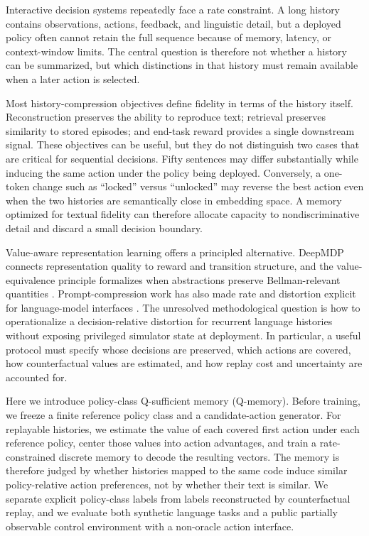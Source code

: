 \documentclass[11pt]{article}
\newcommand{\qmemory}{policy-class Q-sufficient memory (Q-memory)}
\begin{document}
Interactive decision systems repeatedly face a rate constraint. A long history contains observations, actions, feedback, and linguistic detail, but a deployed policy often cannot retain the full sequence because of memory, latency, or context-window limits. The central question is therefore not whether a history can be summarized, but which distinctions in that history must remain available when a later action is selected.

Most history-compression objectives define fidelity in terms of the history itself. Reconstruction preserves the ability to reproduce text; retrieval preserves similarity to stored episodes; and end-task reward provides a single downstream signal. These objectives can be useful, but they do not distinguish two cases that are critical for sequential decisions. Fifty sentences may differ substantially while inducing the same action under the policy being deployed. Conversely, a one-token change such as ``locked'' versus ``unlocked'' may reverse the best action even when the two histories are semantically close in embedding space. A memory optimized for textual fidelity can therefore allocate capacity to nondiscriminative detail and discard a small decision boundary.

Value-aware representation learning offers a principled alternative. DeepMDP connects representation quality to reward and transition structure, and the value-equivalence principle formalizes when abstractions preserve Bellman-relevant quantities \cite{gelada2019deepmdp,grimm2020value}. Prompt-compression work has also made rate and distortion explicit for language-model interfaces \cite{zhu2025turbo,nagle2024limits}. The unresolved methodological question is how to operationalize a decision-relative distortion for recurrent language histories without exposing privileged simulator state at deployment. In particular, a useful protocol must specify whose decisions are preserved, which actions are covered, how counterfactual values are estimated, and how replay cost and uncertainty are accounted for.

Here we introduce \qmemory. Before training, we freeze a finite reference policy class and a candidate-action generator. For replayable histories, we estimate the value of each covered first action under each reference policy, center those values into action advantages, and train a rate-constrained discrete memory to decode the resulting vectors. The memory is therefore judged by whether histories mapped to the same code induce similar policy-relative action preferences, not by whether their text is similar. We separate explicit policy-class labels from labels reconstructed by counterfactual replay, and we evaluate both synthetic language tasks and a public partially observable control environment with a non-oracle action interface.
\end{document}
